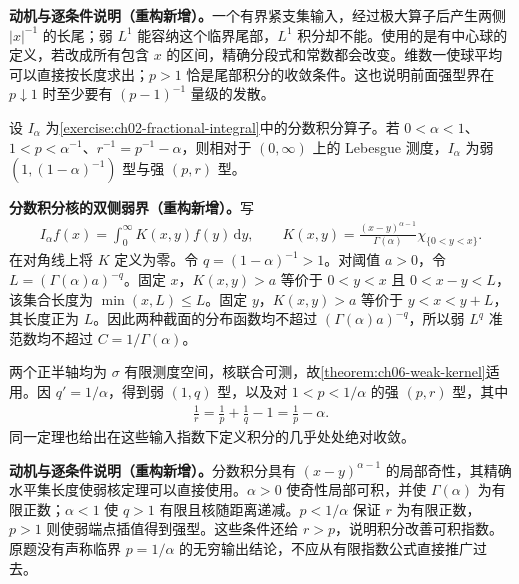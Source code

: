 \documentclass[../../main.tex]{subfiles}
\begin{document}
\begin{remark}
\textbf{动机与逐条件说明（重构新增）。}一个有界紧支集输入，经过极大算子后产生两侧 $|x|^{-1}$ 的长尾；弱 $L^1$ 能容纳这个临界尾部，$L^1$ 积分却不能。使用的是有中心球的定义，若改成所有包含 $x$ 的区间，精确分段式和常数都会改变。维数一使球平均可以直接按长度求出；$p>1$ 恰是尾部积分的收敛条件。这也说明前面强型界在 $p\downarrow1$ 时至少要有 $(p-1)^{-1}$ 量级的发散。
\end{remark}
\begin{exercise}\label{exercise:ch06-fractional-strong-weak}
设 $I_\alpha$ 为\cref{exercise:ch02-fractional-integral}中的分数积分算子。若 $0<\alpha<1$、$1<p<\alpha^{-1}$、$r^{-1}=p^{-1}-\alpha$，则相对于 $(0,\infty)$ 上的 Lebesgue 测度，$I_\alpha$ 为弱 $(1,(1-\alpha)^{-1})$ 型与强 $(p,r)$ 型。
\end{exercise}
\begin{solution}
\textbf{分数积分核的双侧弱界（重构新增）。}写
\begin{align*}
I_\alpha f(x)=\int_0^\infty K(x,y)f(y)\,\mathrm dy,\qquad
K(x,y)=\frac{(x-y)^{\alpha-1}}{\Gamma(\alpha)}\chi_{\{0<y<x\}}.
\end{align*}
在对角线上将 $K$ 定义为零。令 $q=(1-\alpha)^{-1}>1$。对阈值 $a>0$，令 $L=(\Gamma(\alpha)a)^{-q}$。固定 $x$，$K(x,y)>a$ 等价于 $0<y<x$ 且 $0<x-y<L$，该集合长度为 $\min(x,L)\leqslant L$。固定 $y$，$K(x,y)>a$ 等价于 $y<x<y+L$，其长度正为 $L$。因此两种截面的分布函数均不超过 $(\Gamma(\alpha)a)^{-q}$，所以弱 $L^q$ 准范数均不超过 $C=1/\Gamma(\alpha)$。

两个正半轴均为 $\sigma$ 有限测度空间，核联合可测，故\cref{theorem:ch06-weak-kernel}适用。因 $q'=1/\alpha$，得到弱 $(1,q)$ 型，以及对 $1<p<1/\alpha$ 的强 $(p,r)$ 型，其中
\begin{align*}
\frac1r=\frac1p+\frac1q-1=\frac1p-\alpha.
\end{align*}
同一定理也给出在这些输入指数下定义积分的几乎处处绝对收敛。
\end{solution}
\begin{remark}
\textbf{动机与逐条件说明（重构新增）。}分数积分具有 $(x-y)^{\alpha-1}$ 的局部奇性，其精确水平集长度使弱核定理可以直接使用。$\alpha>0$ 使奇性局部可积，并使 $\Gamma(\alpha)$ 为有限正数；$\alpha<1$ 使 $q>1$ 有限且核随距离递减。$p<1/\alpha$ 保证 $r$ 为有限正数，$p>1$ 则使弱端点插值得到强型。这些条件还给 $r>p$，说明积分改善可积指数。原题没有声称临界 $p=1/\alpha$ 的无穷输出结论，不应从有限指数公式直接推广过去。
\end{remark}
\end{document}
